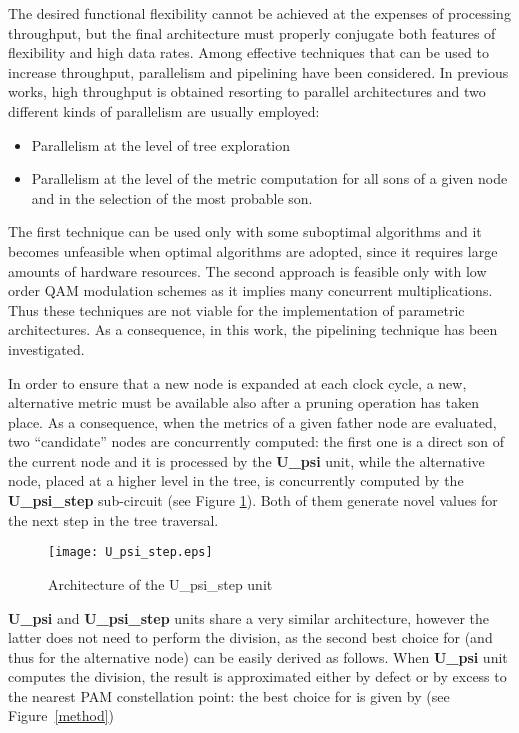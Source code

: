 \documentclass[12pt,onecolumn,draftclsnofoot]{IEEEtran}
\begin{document}
The desired functional flexibility cannot be achieved at the
expenses of processing throughput, but the final architecture must
properly conjugate both features of flexibility and high data rates.
Among effective techniques that can be used to increase throughput,
parallelism and pipelining have been considered. In previous
works, high throughput is obtained resorting to
parallel architectures and two different kinds of parallelism are
usually  employed:
\begin{itemize}
\item Parallelism at the level of tree exploration
\item Parallelism at the level of the metric computation
      for all sons of a given node and in the
      selection of the most probable son.
\end{itemize}
 The first technique can be used only with some suboptimal algorithms \cite{Kbest}
and it becomes unfeasible when optimal algorithms are adopted,
since it requires large amounts of hardware resources.
The second approach
is feasible only with low order QAM modulation schemes as it implies many
concurrent multiplications. Thus these techniques are not viable for the implementation of parametric architectures.
As a consequence, in this work,
the pipelining technique has been investigated.

In order to ensure that a new node is expanded at each clock cycle,
a new, alternative metric must be
available also after a pruning operation has taken place. As a
consequence, when the metrics of a given father node are evaluated, two
``candidate'' nodes are concurrently computed: the first one is a direct son
of the current node and it is processed by the \textbf{U\_psi} unit,
while the alternative node, placed at a higher level in the tree, 
is concurrently computed by the 
\textbf{U\_psi\_step} sub-circuit (see Figure \ref{U_psi_step_block}). Both of 
them generate novel  values for the next step in the tree traversal.
\begin{figure}[t!]
    \begin{center}
    \texttt{[image: U\_psi\_step.eps]} \caption{Architecture of the U\_psi\_step unit}
    \label{U_psi_step_block}
    \end{center}
\end{figure}

\textbf{U\_psi} and \textbf{U\_psi\_step} units share a very similar architecture,
however the latter does not need to perform the division, as the second best choice for 
(and thus for the alternative node)
can be easily derived as follows. When \textbf{U\_psi} unit computes the division, the result is 
approximated either by defect or by excess to the nearest PAM constellation point:
the best choice for  is given by (see Figure~\ref{method})
\end{document}
